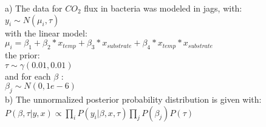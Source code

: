 \documentclass[letterpaper, 12pt]{article}
\begin{document}
\noindent a) The data for $CO_{2}$ flux in bacteria was modeled in jags, with: \\
	\indent	$y_{i} \sim N(\mu_{i}, \tau)$ \\
	with the linear model:\\
	\indent $ \mu_{i} = \beta_{1} + \beta_{2} * x_{temp} + \beta_{3} * x_{substrate} + \beta_{4} * x_{temp} * x_{substrate}$\\
	the prior:\\
	\indent $\tau \sim \gamma(0.01, 0.01) $\\
	and for each $\beta$ :\\
	\indent $ \beta_{j} \sim N(0, 1e-6)$\\


\noindent b) The unnormalized posterior probability distribution is given with:\\
	\indent $P(\beta, \tau | y, x) \propto \prod_{i} P(y_{i} | \beta, x, \tau) \prod_{j} P(\beta_{j}) P(\tau)$
\end{document}
